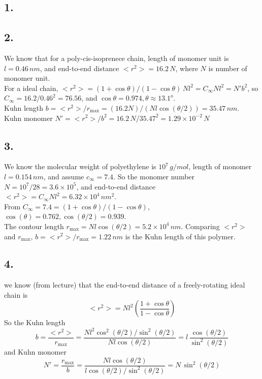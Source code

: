 \documentclass[a4paper]{article}
\begin{document}
\subsection*{1.}

\subsection*{2.}
We know that for a poly-cis-isoprenece chain, length of monomer unit is $l=0.46\,nm$, 
and end-to-end distance $<r^2> = 16.2\,N$, where $N$ is number of monomer unit. \\
For a ideal chain, $<r^2> = (1+\cos\theta )/ (1-\cos \theta) \, N l^2 =  C_\infty N l^2 = N' b^2$, 
so $C_\infty = 16.2/0.46^2 = 76.56$, and $\cos \theta = 0.974, \theta \approx 13.1^o$.\\
Kuhn length $b = <r^2> / r_{\max} = (16.2N) / (N l \cos (\theta/2)) = 35.47\,nm$.  \\
Kuhn monomer $N' = <r^2> / b^2 = 16.2\,N / 35.47^2 = 1.29 \times 10^{-2}\,N$

\subsection*{3.}
We know the molecular weight of polyethylene is $10^7\, g/mol$, length of monomer $l =0.154\,nm$, and assume $c_\infty = 7.4$.
So the monomer number $N = 10^7/28 = 3.6 \times 10^5$, and end-to-end distance $<r^2> = C_\infty N l^2 = 6.32 \times 10^4\,nm^2$.  \\
From $C_\infty = 7.4 = (1+\cos \theta) / (1-\cos\theta)$, $\cos(\theta) = 0.762, \cos(\theta/2) =0.939$.  \\
The contour length $r_{\max} = N l \cos(\theta /2) = 5.2 \times 10^4\,nm$.
Comparing $<r^2>$ and $r_{\max}$, $b = <r^2> / r_{\max} = 1.22\,nm$ is the Kuhn length of this polymer.

\subsection*{4.}
we know (from lecture) that the end-to-end distance of a freely-rotating ideal chain is 
\[
    <r^2> = N l^2 \left( \frac{1+\cos \theta}{1-\cos \theta} \right) 
\]
So the Kuhn length 
\[
    b = \frac{<r^2>}{r_{\max}} = \frac{N l^2 \cos^2 (\theta /2) / \sin^2 (\theta /2)}{Nl\cos(\theta/2)}
      = l\, \frac{\cos (\theta /2)}{\sin^2 (\theta /2)}
\]
and 
Kuhn monomer 
\[
    N' = \frac{r_{\max}}{b} = \frac{N l \cos (\theta /2)}{l \cos (\theta /2) / \sin^2(\theta /2)}
       = N\, \sin^2(\theta /2)
\]
%
\end{document}
